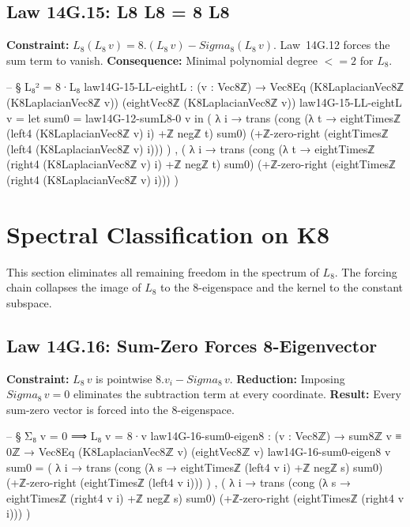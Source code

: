 \documentclass[11pt,a4paper]{book}
\def\Sigma{Sigma}%
\def\circ{o}%
\def\cdot{.}%
\def\leq{<=}%
\def\texorpdfstring#1#2{#2}%
\begin{document}
\subsection{Law 14G.15: \texorpdfstring{$L_8 \circ L_8 = 8 \cdot L_8$}{L8 L8 = 8 L8}}

\textbf{Constraint:} $L_8 (L_8\,v) = 8 \cdot (L_8\,v) - \Sigma_8 (L_8\,v)$.
Law~14G.12 forces the sum term to vanish.
\textbf{Consequence:} Minimal polynomial degree $\leq 2$ for $L_8$.

\begin{code}
-- § L₈² = 8·L₈
law14G-15-LL-eightL : (v : Vec8ℤ) → Vec8Eq (K8LaplacianVec8ℤ (K8LaplacianVec8ℤ v)) (eightVec8ℤ (K8LaplacianVec8ℤ v))
law14G-15-LL-eightL v =
  let sum0 = law14G-12-sumL8-0 v in
  ( λ i →
      trans
        (cong (λ t → eightTimesℤ (left4 (K8LaplacianVec8ℤ v) i) +ℤ negℤ t) sum0)
        (+ℤ-zero-right (eightTimesℤ (left4 (K8LaplacianVec8ℤ v) i)))
  ) ,
  ( λ i →
      trans
        (cong (λ t → eightTimesℤ (right4 (K8LaplacianVec8ℤ v) i) +ℤ negℤ t) sum0)
        (+ℤ-zero-right (eightTimesℤ (right4 (K8LaplacianVec8ℤ v) i)))
  )
\end{code}

\section{Spectral Classification on K\texorpdfstring{$_8$}{8}}

This section eliminates all remaining freedom in the spectrum of $L_8$.
The forcing chain collapses the image of $L_8$ to the $8$-eigenspace and the kernel to the constant subspace.

\subsection{Law 14G.16: Sum-Zero Forces 8-Eigenvector}

\textbf{Constraint:} $L_8\,v$ is pointwise $8 \cdot v_i - \Sigma_8\,v$.
\textbf{Reduction:} Imposing $\Sigma_8\,v = 0$ eliminates the subtraction term at every coordinate.
\textbf{Result:} Every sum-zero vector is forced into the $8$-eigenspace.

\begin{code}
-- § Σ₈ v = 0 ⟹ L₈ v = 8·v
law14G-16-sum0-eigen8 : (v : Vec8ℤ) → sum8ℤ v ≡ 0ℤ → Vec8Eq (K8LaplacianVec8ℤ v) (eightVec8ℤ v)
law14G-16-sum0-eigen8 v sum0 =
  ( λ i →
      trans
        (cong (λ s → eightTimesℤ (left4 v i) +ℤ negℤ s) sum0)
        (+ℤ-zero-right (eightTimesℤ (left4 v i)))
  ) ,
  ( λ i →
      trans
        (cong (λ s → eightTimesℤ (right4 v i) +ℤ negℤ s) sum0)
        (+ℤ-zero-right (eightTimesℤ (right4 v i)))
  )
\end{code}
\end{document}

